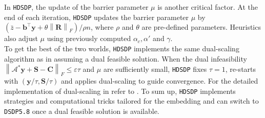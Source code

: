 In {{\texttt{HDSDP}}}, the update of the barrier parameter $\mu$ is another
critical factor. At the end of each iteration, {{\texttt{HDSDP}}} updates the
barrier parameter $\mu$ by $\left( \bar{z} - \mathbf{b}^{\top} \mathbf{y} + \theta \left\|
\mathbf{R} \right\|_F \right) / \rho n$, where $\rho$ and $\theta$ are pre-defined
parameters. Heuristics also adjust $\mu$ using  previously computed $\alpha_c, \alpha'$ and $\gamma$. \\

To get the best of the two worlds, {{\texttt{HDSDP}}} implements the same
dual-scaling algorithm as in  assuming a dual feasible solution. 
When the dual infeasibility
$\left\| \mathcal{A}^{\ast} \mathbf{y} + \mathbf{S} - \mathbf{C} \right\|_F \leq \varepsilon \tau$ and $\mu$
are sufficiently small, {{\texttt{HDSDP}}} fixes $\tau = 1$, re-starts with
$\left( \mathbf{y} / \tau, \mathbf{S} / \tau \right)$ and applies dual-scaling to guide
convergence. For the detailed implementation of dual-scaling in
 refer to {\cite{benson2008algorithm}}. To sum up,
{{\texttt{HDSDP}}} implements strategies and computational tricks tailored for
the embedding and can switch to {{\texttt{DSDP5.8}}} once a dual feasible solution is available.
